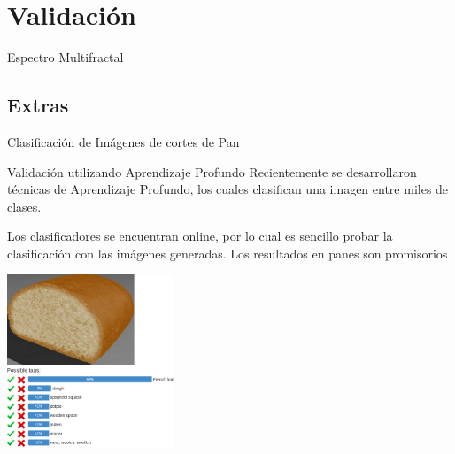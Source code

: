 \documentclass[spanish]{beamer}
\begin{document}
\section{Validación}

\begin{frame}{Espectro Multifractal}

\end{frame}

\subsection{Extras}

\begin{frame}{Clasificación de Imágenes de cortes de Pan}

\end{frame}

\begin{frame}{Validación utilizando Aprendizaje Profundo}
Recientemente se desarrollaron técnicas de Aprendizaje Profundo, los cuales clasifican una imagen entre miles de clases.

Los clasificadores se encuentran online, por lo cual es sencillo probar la clasificación con las imágenes generadas. Los resultados en panes son promisorios

\centerline{\includegraphics[width=5cm]{../figures/deep1}}

\end{frame}
\end{document}
